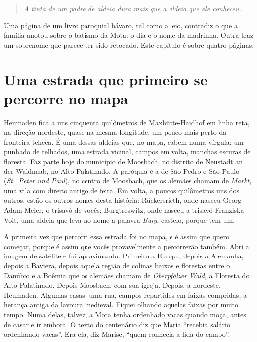 \documentclass[
  brazilian,
  11pt,
  openany]{book}
\begin{document}
\begin{quote}
\emph{A tinta de um padre de aldeia dura mais que a aldeia que ele
conheceu.}
\end{quote}

Uma página de um livro paroquial bávaro, tal como a leio, contradiz o
que a família anotou sobre o batismo da Mota: o dia e o nome da
madrinha. Outra traz um sobrenome que parece ter sido retocado. Este
capítulo é sobre quatro páginas.

\section{Uma estrada que primeiro se percorre no
mapa}\label{uma-estrada-que-primeiro-se-percorre-no-mapa}

Heumaden fica a uns cinquenta quilômetros de Maxhütte-Haidhof em linha
reta, na direção nordeste, quase na mesma longitude, um pouco mais perto
da fronteira tcheca. É uma dessas aldeias que, no mapa, cabem numa
vírgula: um punhado de telhados, uma estrada vicinal, campos em volta,
manchas escuras de floresta. Faz parte hoje do município de Moosbach, no
distrito de Neustadt an der Waldnaab, no Alto Palatinado. A paróquia é a
de São Pedro e São Paulo (\emph{St.~Peter und Paul}), no centro de
Moosbach, que os alemães chamam de \emph{Markt}, uma vila com direito
antigo de feira. Em volta, a poucos quilômetros uns dos outros, estão os
outros nomes desta história: Rückersrieth, onde nasceu Georg Adam Meier,
o trisavô de vocês; Burgtreswitz, onde nasceu a trisavó Franziska Voit,
uma aldeia que leva no nome a palavra \emph{Burg}, castelo, porque tem
um.

A primeira vez que percorri essa estrada foi no mapa, e é assim que
quero começar, porque é assim que vocês provavelmente a percorrerão
também. Abri a imagem de satélite e fui aproximando. Primeiro a Europa,
depois a Alemanha, depois a Baviera, depois aquela região de colinas
baixas e florestas entre o Danúbio e a Boêmia que os alemães chamam de
\emph{Oberpfälzer Wald}, a Floresta do Alto Palatinado. Depois Moosbach,
com sua igreja. Depois, a nordeste, Heumaden. Algumas casas, uma rua,
campos repartidos em faixas compridas, a herança antiga da lavoura
medieval. Fiquei olhando aquelas faixas por muito tempo. Numa delas,
talvez, a Mota tenha ordenhado vacas quando moça, antes de casar e ir
embora. O texto do centenário diz que Maria ``recebia salário ordenhando
vacas''. Era ela, diz Marise, ``quem conhecia a lida do campo''.
\end{document}
